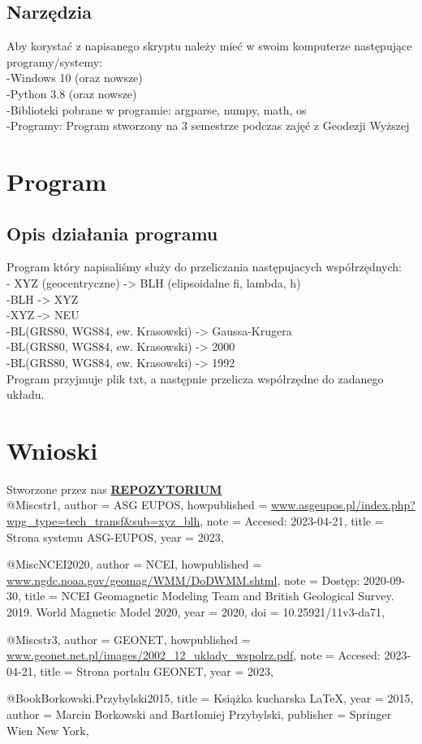 \documentclass[a4paper, 12p] {article}
\begin{document}
\subsection{Narzędzia}
Aby korystać z napisanego skryptu należy mieć w swoim komputerze następujące programy/systemy: \\
-Windows 10 (oraz nowsze) \\ 
-Python 3.8 (oraz nowsze) \\ 
-Biblioteki pobrane w programie: argparse, numpy, math, os \\ 
-Programy: Program stworzony na 3 semestrze podczas zajęć z Geodezji Wyższej \\


\newpage
\section{Program}

\subsection{Opis działania programu}
Program który napisaliśmy służy do przeliczania następujacych współrzędnych:\\
- XYZ (geocentryczne) -> BLH (elipsoidalne fi, lambda, h)\\
-BLH -> XYZ\\
-XYZ -> NEU\\
-BL(GRS80, WGS84, ew. Krasowski) -> Gaussa-Krugera\\
-BL(GRS80, WGS84, ew. Krasowski) -> 2000\\
-BL(GRS80, WGS84, ew. Krasowski) -> 1992\\
Program przyjmuje plik txt, a następnie przelicza współrzędne do zadanego układu.

\newpage
\section{Wnioski}
\large Stworzone przez nas \textbf{\href{https://github.com/20KuBa02/Projekt_1}
{REPOZYTORIUM}}\\



@Misc{str1,
    author       = {{ASG EUPOS}},
    howpublished = {\url{www.asgeupos.pl/index.php?wpg_type=tech_transf&sub=xyz_blh}},
    note         = {Accesed: 2023-04-21},
    title        = {{Strona systemu ASG-EUPOS}},
    year         = {2023},
}

@Misc{NCEI2020,
    author       = {{NCEI}},
    howpublished = {\url{www.ngdc.noaa.gov/geomag/WMM/DoDWMM.shtml}},
    note         = {Dostęp: 2020-09-30},
    title        = {{NCEI Geomagnetic Modeling Team and British Geological Survey. 2019. World Magnetic Model 2020}},
    year         = {2020},
    doi          = {10.25921/11v3-da71},
}

@Misc{str3,
    author       = {{GEONET}},
    howpublished = {\url{www.geonet.net.pl/images/2002_12_uklady_wspolrz.pdf}},
    note         = {Accesed: 2023-04-21},
    title        = {{Strona portalu GEONET}},
    year         = {2023},
}

@Book{Borkowski.Przybylski2015,
    title    = {Książka kucharska LaTeX},
    year     = {2015},
    author   = {Marcin Borkowski and Bartłomiej Przybylski},
    publisher = {Springer Wien New York},
}
\end{document}

